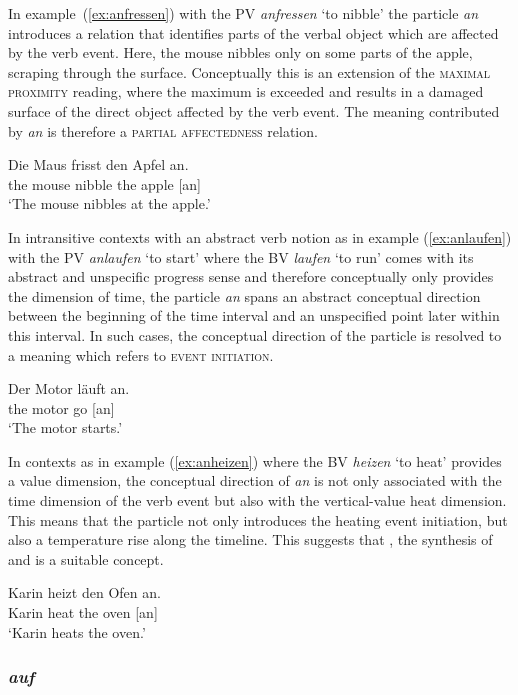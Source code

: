 \documentclass[output=paper]{langsci/langscibook}
\begin{document}
In example~(\ref{ex:anfressen}) with the PV \textit{anfressen} `to
nibble' the particle \textit{an} introduces a relation that
identifies parts of the verbal object which are affected by the verb
event. Here, the mouse nibbles only on some parts of the apple,
scraping through the surface. Conceptually this is an extension of the
\textsc{maximal proximity} reading, where the maximum is exceeded and
results in a damaged surface of the direct object affected by the verb
event. The meaning contributed by \textit{an} is therefore a
\textsc{partial affectedness} relation.

\ea\label{ex:anfressen}
\gll Die Maus frisst den Apfel an.\\
the mouse nibble the apple [an]\\
\glt `The mouse nibbles at the apple.'
\z

In intransitive contexts with an abstract verb notion as in example
(\ref{ex:anlaufen}) with the PV \textit{anlaufen} `to start' where
the BV \textit{laufen} `to run' comes with its abstract and
unspecific progress sense and therefore conceptually only provides the
dimension of time, the particle \textit{an} spans an abstract
conceptual direction between the beginning of the time interval and an
unspecified point later within this interval. In such cases, the
conceptual direction of the particle is resolved to a meaning which
refers to \textsc{event initiation}.

\ea\label{ex:anlaufen}
\gll Der Motor läuft an.\\
the motor go [an]\\
\glt `The motor starts.'
\z

In contexts as in example (\ref{ex:anheizen}) where the BV
\textit{heizen} `to heat' provides a value dimension, the conceptual
direction of \textit{an} is not only associated with the time
dimension of the verb event but also with the vertical-value heat
dimension. This means that the particle not only introduces the
heating event initiation, but also a temperature rise along the
timeline. This suggests that , the synthesis of
 and  is a suitable concept.

\ea\label{ex:anheizen}
\gll Karin heizt den Ofen an.\\
Karin heat the oven [an]\\
\glt `Karin heats the oven.'
\z

\subsubsection{\textit{auf}}
\end{document}
